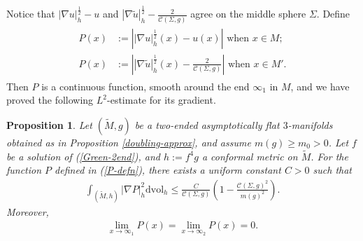\documentclass[letter]{amsart}
\newtheorem{prop}[thm]{Proposition}
\theoremstyle{definition}
\theoremstyle{remark}
\begin{document}

Notice that $|\nabla u|_h^{\frac{1}{2}} - u$ and $|\nabla \tilde{u}|_h^{\frac{1}{2}} - \frac{2}{\mathcal{C}(\Sigma ,g)}$ agree on the middle sphere $\Sigma $. Define 
\begin{align}\label{P-defn}
	\begin{split}
		P(x) &:= \left| |\nabla u|_h^{\frac{1}{2}}(x) - u(x) \right| \text{ when } x \in M;\\
		P(x)&:=\left| |\nabla \tilde{u}|_h^{\frac{1}{2}}(x) - \frac{2}{\mathcal{C}(\Sigma ,g)} \right| \text{ when } x \in M'.
\end{split}
\end{align}
Then $P$ is a continuous function, smooth around the end $\infty_1$ in $M$, and we have proved the following $L^2$-estimate for its gradient.
\begin{prop}\label{P-prop}
	Let $(\tilde{M}, g)$ be a two-ended asymptotically flat $3$-manifolds obtained as in Proposition \ref{doubling-approx}, and assume $m(g) \geq m_0>0$. Let $f$ be a solution of (\ref{Green-2end}), and $h := f ^{4} g$ a conformal metric on $\tilde{M}$. For the function $P$ defined in (\ref{P-defn}), there exists a uniform constant $C>0$ such that
\begin{align}\label{nbl-norm-f}
\int_{(\tilde{M}, h)} |\nabla P|^2_h \mathrm{dvol}_h \leq \frac{C}{\mathcal{C}(\Sigma ,g)} \left( 1- \frac{\mathcal{C}(\Sigma ,g)^2}{m(g)^2} \right) .	
\end{align}
Moreover, 
\begin{align}\label{nbl-f-limit}
	\lim_{x\to \infty_1} P(x) = \lim_{x\to \infty_2} P(x) = 0.
\end{align}
\end{prop}
\end{document}
